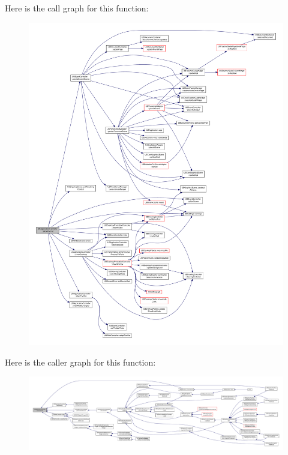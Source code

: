 Here is the call graph for this function\-:
\nopagebreak
\begin{figure}[H]
\begin{center}
\leavevmode
\includegraphics[width=350pt]{da/d14/class_u_b_application_controller_ae3d983750cf95a35f7e125f57844957f_cgraph}
\end{center}
\end{figure}




Here is the caller graph for this function\-:
\nopagebreak
\begin{figure}[H]
\begin{center}
\leavevmode
\includegraphics[width=350pt]{da/d14/class_u_b_application_controller_ae3d983750cf95a35f7e125f57844957f_icgraph}
\end{center}
\end{figure}


